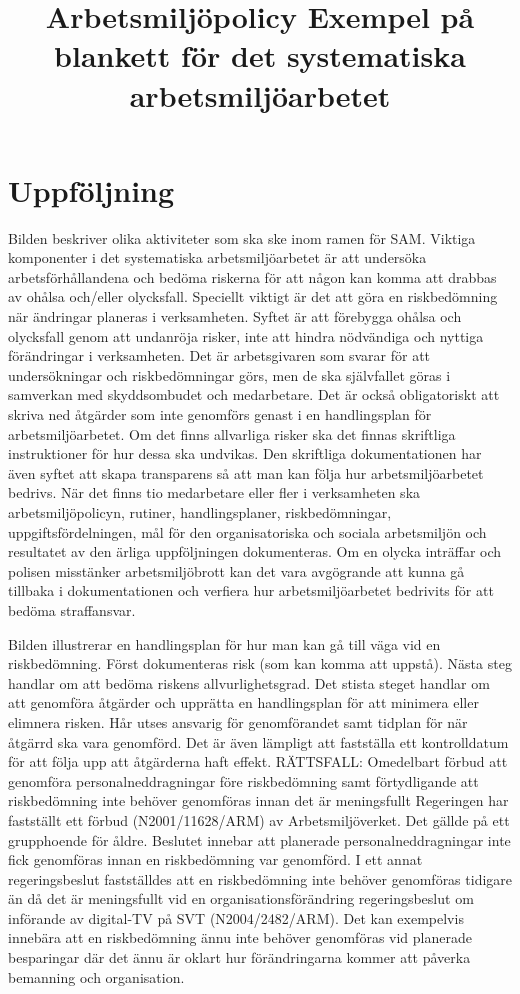 \title{
Arbetsmiljöpolicy
}
\section*{Uppföljning}

Bilden beskriver olika aktiviteter som ska ske inom ramen för SAM.
Viktiga komponenter i det systematiska arbetsmiljöarbetet är att undersöka arbetsförhållandena och bedöma riskerna för att någon kan komma att drabbas av ohålsa och/eller olycksfall.
Speciellt viktigt är det att göra en riskbedömning när ändringar planeras i verksamheten. Syftet är att förebygga ohålsa och olycksfall genom att undanröja risker, inte att hindra nödvändiga och nyttiga förändringar i verksamheten. Det är arbetsgivaren som svarar för att undersökningar och riskbedömningar görs, men de ska självfallet göras i samverkan med skyddsombudet och medarbetare.
Det är också obligatoriskt att skriva ned åtgärder som inte genomförs genast i en handlingsplan för arbetsmiljöarbetet. Om det finns allvarliga risker ska det finnas skriftliga instruktioner för hur dessa ska undvikas.
Den skriftliga dokumentationen har även syftet att skapa transparens så att man kan följa hur arbetsmiljöarbetet bedrivs. När det finns tio medarbetare eller fler i verksamheten ska arbetsmiljöpolicyn, rutiner, handlingsplaner, riskbedömningar, uppgiftsfördelningen, mål för den organisatoriska och sociala arbetsmiljön och resultatet av den ärliga uppföljningen dokumenteras.
Om en olycka inträffar och polisen misstänker arbetsmiljöbrott kan det vara avgögrande att kunna gå tillbaka i dokumentationen och verfiera hur arbetsmiljöarbetet bedrivits för att bedöma straffansvar.

\title{
Exempel på blankett för det systematiska arbetsmiljöarbetet
}

Bilden illustrerar en handlingsplan för hur man kan gå till väga vid en riskbedömning. Först dokumenteras risk (som kan komma att uppstå). Nästa steg handlar om att bedöma riskens allvurlighetsgrad. Det stista steget handlar om att genomföra åtgärder och upprätta en handlingsplan för att minimera eller elimnera risken. Hår utses ansvarig för genomförandet samt tidplan för när åtgärrd ska vara genomförd. Det är även lämpligt att fastställa ett kontrolldatum för att följa upp att åtgärderna haft effekt.
RÄTTSFALL: Omedelbart förbud att genomföra personalneddragningar före riskbedömning samt förtydligande att riskbedömning inte behöver genomföras innan det är meningsfullt
Regeringen har fastställt ett förbud (N2001/11628/ARM) av Arbetsmiljöverket. Det gällde på ett grupphoende för åldre. Beslutet innebar att planerade personalneddragningar inte fick genomföras innan en riskbedömning var genomförd.
I ett annat regeringsbeslut fastställdes att en riskbedömning inte behöver genomföras tidigare än då det är meningsfullt vid en organisationsförändring regeringsbeslut om införande av digital-TV på SVT (N2004/2482/ARM). Det kan exempelvis innebära att en riskbedömning ännu inte behöver genomföras vid planerade besparingar där det ännu är oklart hur förändringarna kommer att påverka bemanning och organisation.

